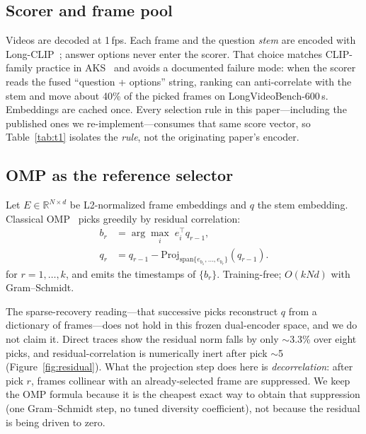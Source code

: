 \documentclass[11pt]{article}
\begin{document}
\subsection{Scorer and frame pool}
Videos are decoded at 1\,fps.
Each frame and the question \emph{stem} are encoded with Long-CLIP~\citep{zhang2024longclip}; answer options never enter the scorer.
That choice matches CLIP-family practice in AKS~\citep{tang2025aks} and avoids a documented failure mode: when the scorer reads the fused ``question + options'' string, ranking can anti-correlate with the stem and move about 40\% of the picked frames on LongVideoBench-600\,s.
Embeddings are cached once.
Every selection rule in this paper---including the published ones we re-implement---consumes that same score vector, so Table~\ref{tab:t1} isolates the \emph{rule}, not the originating paper's encoder.

\subsection{OMP as the reference selector}
Let $E\in\mathbb{R}^{N\times d}$ be L2-normalized frame embeddings and $q$ the stem embedding.
Classical OMP~\citep{pati1993omp} picks greedily by residual correlation:
\begin{equation}
\begin{aligned}
b_r &= \arg\max_i \; e_i^\top q_{r-1}, \\
q_r &= q_{r-1} - \mathrm{Proj}_{\mathrm{span}\{e_{b_1},\ldots,e_{b_r}\}}(q_{r-1}).
\end{aligned}
\end{equation}
for $r=1,\ldots,k$, and emits the timestamps of $\{b_r\}$.
Training-free; $O(kNd)$ with Gram--Schmidt.

The sparse-recovery reading---that successive picks reconstruct $q$ from a dictionary of frames---does not hold in this frozen dual-encoder space, and we do not claim it.
Direct traces show the residual norm falls by only $\sim$3.3\% over eight picks, and residual-correlation is numerically inert after pick $\sim$5 (Figure~\ref{fig:residual}).
What the projection step does here is \emph{decorrelation}: after pick $r$, frames collinear with an already-selected frame are suppressed.
We keep the OMP formula because it is the cheapest exact way to obtain that suppression (one Gram--Schmidt step, no tuned diversity coefficient), not because the residual is being driven to zero.
\end{document}
